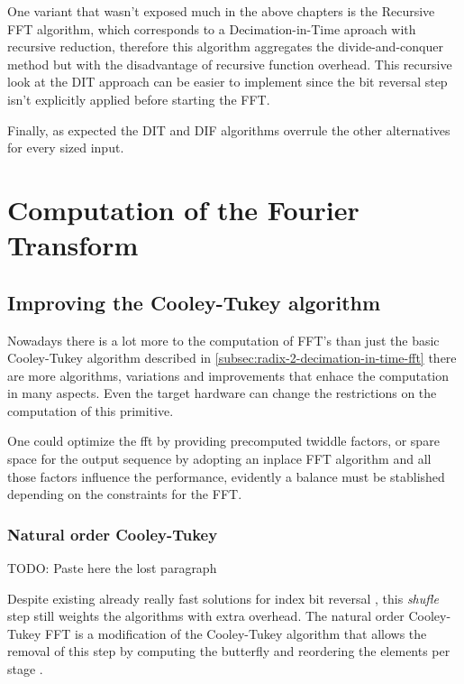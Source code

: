 \documentclass[
  oneside,
  11pt, a4paper,
  footinclude=true,
  headinclude=true,
  cleardoublepage=empty
]{scrbook}
\begin{document}
One variant that wasn't exposed much in the above chapters is the Recursive FFT algorithm, which corresponds to a Decimation-in-Time aproach with recursive reduction, therefore this algorithm aggregates the divide-and-conquer method but with the disadvantage of recursive function overhead. This recursive look at the DIT approach can be easier to implement since the bit reversal step isn't explicitly applied before starting the FFT.

Finally, as expected the DIT and DIF algorithms overrule the other alternatives for every sized input.



\chapter{Computation of the Fourier Transform}


\section{Improving the Cooley-Tukey algorithm}
Nowadays there is a lot more to the computation of FFT's than just the basic Cooley-Tukey algorithm described in \ref{subsec:radix-2-decimation-in-time-fft} there are more algorithms, variations and improvements that enhace the computation in many aspects. Even the target hardware can change the restrictions on the computation of this primitive.

One could optimize the fft by providing precomputed twiddle factors, or spare space for the output sequence by adopting an inplace FFT algorithm  and all those factors influence the performance, evidently a balance must be stablished depending on the constraints for the FFT.

\subsection{Natural order Cooley-Tukey} \label{subsec:natural-order-ct}

TODO: Paste here the lost paragraph

Despite existing already really fast solutions for index bit reversal \cite{prado2004new}, this \textit{shufle} step still weights the algorithms with extra overhead. The natural order Cooley-Tukey FFT is a modification of the Cooley-Tukey algorithm that allows the removal of this step by computing the butterfly and reordering the elements per stage \cite{OTFFTnoct}.
\end{document}
